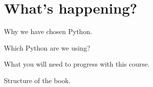 \section{What's happening?} \label{sec:WhyPython}

Why we have chosen Python.

Which Python are we using?

What you will need to progress with this course.

Structure of the book.
